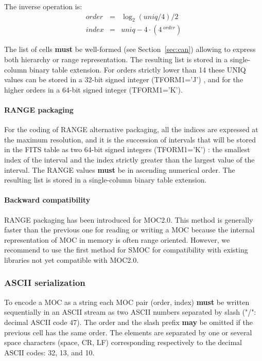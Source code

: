\documentclass[11pt,a4paper]{ivoa}
\begin{document}
\par\noindent
The inverse operation is:
\begin{eqnarray*}
    \textit{order} & = &\log_2(\textit{uniq}/4)/2\\
    \textit{index} & = &\textit{uniq} - 4 \cdot (4\,^\textit{order})
\end{eqnarray*}

\par\noindent The list of cells {\bf must} be well-formed
(see Section~\ref{sec:can}) allowing
to express both hierarchy or range representation. The resulting
list is stored in a single-column binary table extension.
For orders strictly lower than 14 these UNIQ values can be stored
in a 32-bit signed integer (TFORM1='J') , and for the higher
orders in a 64-bit signed integer (TFORM1='K').

\paragraph{RANGE packaging}
For the coding of RANGE alternative packaging, all the indices are
expressed at the maximum resolution, and it is the succession
of intervals that will be stored in the FITS table as 
two 64-bit signed integers (TFORM1='K') :
the smallest index of the interval and the index strictly greater
than the largest value of the interval. The RANGE values {\bf must}
be in ascending numerical order. The resulting list is stored in a
single-column binary table extension. 


\paragraph{Backward compatibility}
RANGE packaging has been introduced for MOC2.0.
This method is generally faster than the previous one for reading or
writing a MOC because the internal representation of MOC
in memory is often range oriented. However, we recommend to
use the first method for SMOC for compatibility with existing libraries 
not yet compatible with MOC2.0.

\subsubsection{ASCII serialization}
To encode a MOC as a string each MOC pair (order, index) {\bf must} be written
sequentially in an ASCII stream as two ASCII numbers separated
by slash ("/": decimal ASCII code 47). The order and the slash prefix
{\bf may} be omitted if the previous cell has the same order. The
elements are separated by one or several space characters (space, CR,
LF) corresponding respectively to the decimal ASCII codes: 32, 13, and
10.
\end{document}
